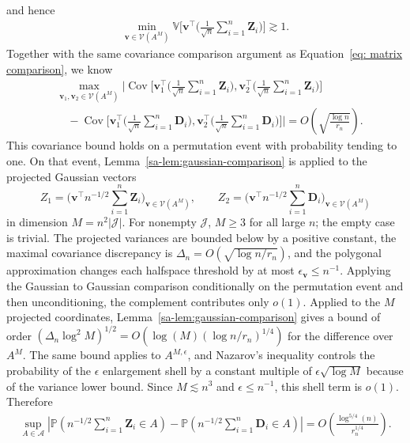 \documentclass[10pt]{article}
\def\bv{\mathbf{v}}
\def\bD{\mathbf{D}}
\def\bZ{\mathbf{Z}}
\def\bD{\boldsymbol{D}}
\def\P{\mathbb{P}}
\def\V{\mathbb{V}}
\theoremstyle{definition}
\theoremstyle{remark}
\begin{document}
and hence
\begin{align*}
    \min_{\bv \in \mathcal{V}(A^M)}
    \V \bigg[\bv^\top \Big(\frac{1}{\sqrt{n}}\sum_{i = 1}^n \bZ_i \Big)\bigg]
    \gtrsim 1.
\end{align*}
Together with the same covariance comparison argument as Equation~\eqref{eq: matrix comparison}, we know
\begin{align*}
    &\max_{\bv_1, \bv_2 \in \mathcal{V}(A^M)}
    \bigg|
        \operatorname{Cov} \bigg[
            \bv_1^\top \bigg(\frac{1}{\sqrt{n}}\sum_{i = 1}^n \bZ_i \bigg),
            \bv_2^\top \bigg(\frac{1}{\sqrt{n}}\sum_{i = 1}^n \bZ_i \bigg)
        \bigg] \\
    &\quad -
        \operatorname{Cov} \bigg[
            \bv_1^\top \bigg(\frac{1}{\sqrt{n}}\sum_{i = 1}^n \bD_i \bigg),
            \bv_2^\top \bigg(\frac{1}{\sqrt{n}}\sum_{i = 1}^n \bD_i \bigg)
        \bigg]
    \bigg|
    =
    O\!\left(\sqrt{\frac{\log n}{r_n}}\right).
\end{align*}
This covariance bound holds on a permutation event with probability tending to one. On that event, Lemma~\ref{sa-lem:gaussian-comparison} is applied to the projected Gaussian vectors
\[
    Z_1=\Big(\bv^\top n^{-1/2}\sum_{i=1}^n \bZ_i\Big)_{\bv\in\mathcal V(A^M)},
    \qquad
    Z_2=\Big(\bv^\top n^{-1/2}\sum_{i=1}^n \bD_i\Big)_{\bv\in\mathcal V(A^M)}
\]
in dimension $M=n^2|\mathcal J|$. For nonempty $\mathcal J$, $M\geq3$ for all large $n$; the empty case is trivial. The projected variances are bounded below by a positive constant, the maximal covariance discrepancy is $\Delta_n=O(\sqrt{\log n/r_n})$, and the polygonal approximation changes each halfspace threshold by at most $\epsilon_{\bv}\leq n^{-1}$. Applying the Gaussian to Gaussian comparison conditionally on the permutation event and then unconditioning, the complement contributes only $o(1)$. Applied to the $M$ projected coordinates, Lemma~\ref{sa-lem:gaussian-comparison} gives a bound of order $(\Delta_n\log^2 M)^{1/2}=O(\log(M)(\log n/r_n)^{1/4})$ for the difference over $A^M$. The same bound applies to $A^{M,\epsilon}$, and Nazarov's inequality controls the probability of the $\epsilon$ enlargement shell by a constant multiple of $\epsilon\sqrt{\log M}$ because of the variance lower bound. Since $M\lesssim n^3$ and $\epsilon\leq n^{-1}$, this shell term is $o(1)$. Therefore
\begin{align}\label{eq:fit-gaussian-comparison}
    \sup_{A \in \mathcal{A}} |\P(n^{-1/2}\sum_{i = 1}^n \bZ_i \in A) - \P(n^{-1/2} \sum_{i =1}^n \bD_i \in A)| = O\!\left(\frac{\log^{5/4}(n)}{r_n^{1/4}}\right).
\end{align}
\end{document}
